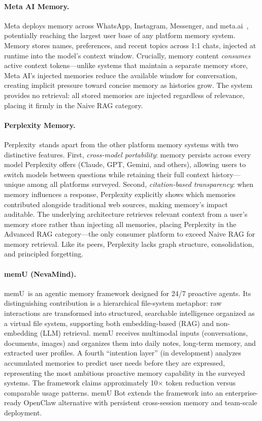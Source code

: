 \paragraph{Meta AI Memory.}
Meta deploys memory across WhatsApp, Instagram, Messenger, and
meta.ai~\cite{meta2025aimemory}\evV, potentially reaching the largest user
base of any platform memory system.  Memory stores names, preferences,
and recent topics across 1:1 chats, injected at runtime into the
model's context window\evV.  Crucially, memory content \emph{consumes}
active context tokens\evI---unlike systems that maintain a separate memory
store, Meta AI's injected memories reduce the available window for
conversation, creating implicit pressure toward concise memory as
histories grow.  The system provides no retrieval\evI: all stored memories
are injected regardless of relevance, placing it firmly in the Naive
RAG category.

\paragraph{Perplexity Memory.}
Perplexity~\cite{perplexity2025memory}\evV stands apart from the other
platform memory systems with two distinctive features.  First,
\emph{cross-model portability}: memory persists across every model
Perplexity offers (Claude, GPT, Gemini, and others), allowing users
to switch models between questions while retaining their full context
history---unique among all platforms surveyed\evV.  Second,
\emph{citation-based transparency}: when memory influences a response,
Perplexity explicitly shows which memories contributed alongside
traditional web sources, making memory's impact auditable\evV.  The
underlying architecture retrieves relevant context from a user's memory
store rather than injecting all memories\evI, placing Perplexity in the
Advanced RAG category---the only consumer platform to exceed Naive RAG
for memory retrieval.  Like its peers, Perplexity lacks graph structure,
consolidation, and principled forgetting\evI.

\paragraph{memU (NevaMind).}
memU~\cite{memu2026}\evV is an agentic memory framework designed for 24/7
proactive agents.  Its distinguishing contribution is a hierarchical
file-system metaphor: raw interactions are transformed into structured,
searchable intelligence organized as a virtual file system, supporting
both embedding-based (RAG) and non-embedding (LLM) retrieval\evV.  memU
receives multimodal inputs (conversations, documents, images) and
organizes them into daily notes, long-term memory, and extracted user
profiles\evV.  A fourth ``intention layer'' (in development) analyzes
accumulated memories to predict user needs before they are expressed\evV,
representing the most ambitious proactive memory capability in the
surveyed systems.  The framework claims approximately 10$\times$ token
reduction versus comparable usage patterns\evV.  memU Bot extends the
framework into an enterprise-ready OpenClaw alternative with persistent
cross-session memory and team-scale deployment\evV.

